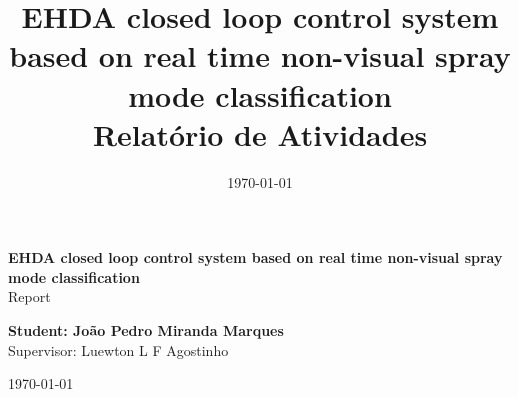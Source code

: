\begin{titlepage}
    \begin{center}
           
    \begin{figure}
            \centering
            \hspace{0.1\textwidth}
            \vspace{3cm} 
        \end{figure}

    

    {\bf\Large EHDA closed loop control system based on real time non-visual spray mode classification\\}
    \vspace{1cm} 
    {\Large Report}
    \vspace{2cm}  
    
    {\bf\large Student: João Pedro Miranda Marques}\\
    \vspace{2cm}
    {\large Supervisor: Luewton L F Agostinho}
    \vspace{2cm}  

    \today
    \vspace{2cm}  
       

    \large \date{\today}
    \end{center}
    
    \end{titlepage}



\title{
    EHDA closed loop control system based on real time non-visual spray mode classification \\
    \large Relatório de Atividades}

